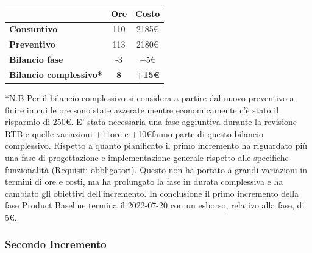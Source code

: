\begin{center}
	\renewcommand{\arraystretch}{1.8}
	\begin{tabular}{ | l |c|c| }
    \hline
    & \textbf{Ore} & \textbf{Costo} \\
	\hline
    \textbf{Consuntivo} & 110 & 2185\euro \\
    \hline
    \textbf{Preventivo} & 113 & 2180\euro \\
    \hline
    \textbf{Bilancio fase} & -3 & +5\euro \\
    \hline
    \textbf{Bilancio complessivo*} & \textbf{8} & \textbf{+15\euro} \\
    \hline
    \end{tabular}
\end{center}
*N.B Per il bilancio complessivo si considera a partire dal nuovo preventivo a finire in cui le ore sono state azzerate mentre economicamente c'è stato il risparmio di 250\euro.
E' stata necessaria una fase aggiuntiva durante la revisione RTB e quelle variazioni +11ore e +10\euro fanno parte di questo bilancio complessivo. \newline
Rispetto a quanto pianificato il primo incremento ha riguardato più una fase di progettazione e implementazione generale rispetto alle specifiche funzionalità (Requisiti obbligatori). Questo non ha portato a grandi variazioni in termini di ore e costi, ma ha prolungato la fase in durata complessiva e ha cambiato gli obiettivi dell'incremento.
In conclusione il primo incremento della fase Product Baseline termina il 2022-07-20 con un esborso, relativo
alla fase, di 5€.

\newpage

\subsubsection{Secondo Incremento}


